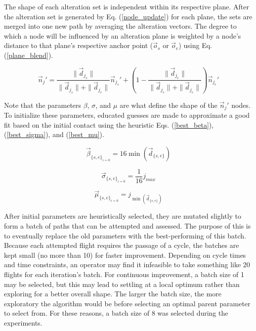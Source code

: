 \documentclass[conf]{new-aiaa}
\begin{document}
The shape of each alteration set is independent within its respective plane. After the alteration set is generated by Eq. (\ref{node_update}) for each plane, the sets are merged into one new path by averaging the alteration vectors. The degree to which a node will be influenced by an alteration plane is weighted by a node's distance to that plane's respective anchor point ($\vec{o}_s$ or $\vec{o}_e$) using Eq. (\ref{plane_blend}).

\begin{equation}
\label{plane_blend}
\vec{n}_j' = \frac{\|\vec{d}_{j_e}\|}{\|\vec{d}_{j_s}\| + \|\vec{d}_{j_e}\|}\vec{n}_{j_s}' + \left(1 - \frac{\|\vec{d}_{j_e}\|}{\|\vec{d}_{j_s}\| + \|\vec{d}_{j_e}\|}\right)\vec{n}_{j_e}'
\end{equation}

Note that the parameters $\beta$, $\sigma$, and $\mu$ are what define the shape of the $\vec{n}_j'$ nodes. To initialize these parameters, educated guesses are made to approximate a good fit based on the initial contact using the heuristic Eqs. (\ref{best_beta}), (\ref{best_sigma}), and (\ref{best_mu}).

\begin{equation}
\label{best_beta}
\vec{\beta}_{\{s, e\}_{i = 0}} = 16\min(\vec{d}_{\{s, e\}})
\end{equation}

\begin{equation}
\label{best_sigma}
\vec{\sigma}_{\{s, e\}_{i = 0}} = \frac{1}{16}j_{max}
\end{equation}

\begin{equation}
\label{best_mu}
\vec{\mu}_{\{s, e\}_{i = 0}} = j_{\min(\vec{d}_{\{s, e\}})}
\end{equation}

After initial parameters are heuristically selected, they are mutated slightly to form a batch of paths that can be attempted and assessed. The purpose of this is to eventually replace the old parameters with the best-performing of this batch. Because each attempted flight requires the passage of a cycle, the batches are kept small (no more than 10) for faster improvement. Depending on cycle times and time constraints, an operator may find it infeasible to take something like 20 flights for each iteration's batch. For continuous improvement, a batch size of 1 may be selected, but this may lead to settling at a local optimum rather than exploring for a better overall shape. The larger the batch size, the more exploratory the algorithm would be before selecting an optimal parent parameter to select from. For these reasons, a batch size of 8 was selected during the experiments.
\end{document}
